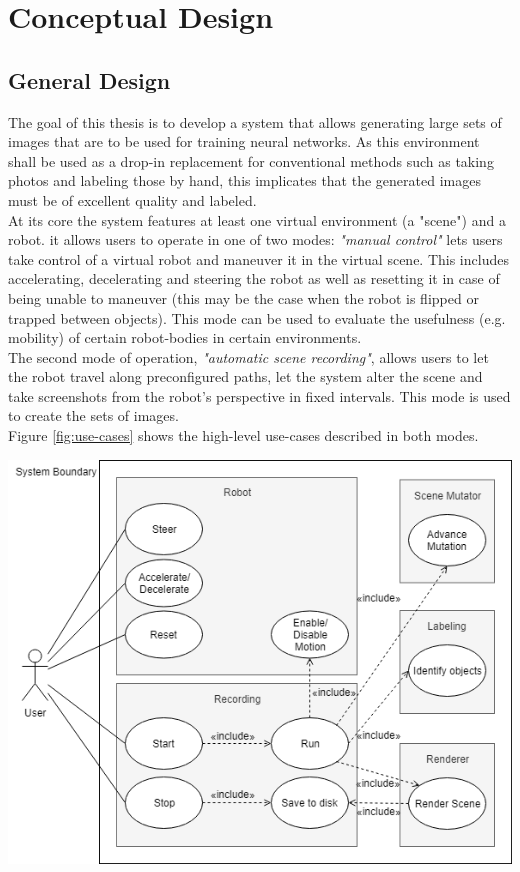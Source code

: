\chapter{Conceptual Design}

\section{General Design}
The goal of this thesis is to develop a system that allows generating large sets of images that are to be used for training neural networks. As this environment shall be used as a drop-in replacement for conventional methods such as taking photos and labeling those by hand, this implicates that the generated images must be of excellent quality and labeled.\\
At its core the system features at least one virtual environment (a "scene") and a robot. it allows users to operate in one of two modes: \textit{"manual control"} lets users take control of a virtual robot and maneuver it in the virtual scene. This includes accelerating, decelerating and steering the robot as well as resetting it in case of being unable to maneuver (this may be the case when the robot is flipped or trapped between objects). This mode can be used to evaluate the usefulness (e.g. mobility) of certain robot-bodies in certain environments.\\
The second mode of operation, \textit{"automatic scene recording"}, allows users to let the robot travel along preconfigured paths, let the system alter the scene and take screenshots from the robot's perspective in fixed intervals. This mode is used to create the sets of images.\\
Figure \ref{fig:use-cases} shows the high-level use-cases described in both modes.

\begin{center}
\noindent\includegraphics[width=15cm]{tex/img/ch04/Use_Cases_03.png}
\label{fig:use-cases}
\end{center}

